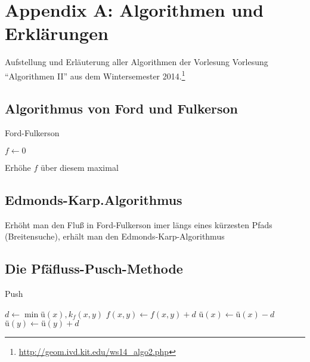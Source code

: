 \section{Appendix A: Algorithmen und Erklärungen}

Aufstellung und Erläuterung aller Algorithmen der Vorlesung Vorlesung "`Algorithmen II"' aus dem Wintersemester 2014.\footnote{\url{http://geom.ivd.kit.edu/ws14_algo2.php}}

\subsection{Algorithmus von Ford und Fulkerson}

\begin{algorithm}[H]
	\caption{Ford-Fulkerson}

	\BlankLine

	$f \longleftarrow 0$

	 {
		Erhöhe $f$ über diesem maximal
	}
\end{algorithm}

\subsection{Edmonds-Karp.Algorithmus}
	Erhöht man den Fluß in Ford-Fulkerson imer längs eines kürzesten Pfads (Breitensuche), erhält man den Edmonds-Karp-Algorithmus
	
\subsection{Die Pfäfluss-Pusch-Methode}
\begin{algorithm}[H]
	\caption{Push}

	\Output{}
	\BlankLine

	$d \longleftarrow \min{ü(x), k_f(x,y)}$ \newline
	$f(x,y) \longleftarrow f(x,y) +d$ \newline
	$ü(x) \longleftarrow ü(x) -d $ \newline
	$ü(y) \longleftarrow ü(y) +d$ \newline
\end{algorithm}

